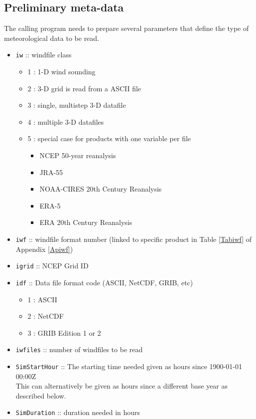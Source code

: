 \documentclass[11pt]{article}   %
\begin{document}
\subsection{Preliminary meta-data}\label{SSecPrelimMetaData}
The calling program needs to prepare several parameters that define the type of meteorological
data to be read.  
\begin{itemize}
\item \texttt{iw} :: windfile class 
 \begin{itemize}
 \item 1 : 1-D wind sounding
 \item 2 : 3-D grid is read from a ASCII file
 \item 3 : single, multistep 3-D datafile
 \item 4 : multiple 3-D datafiles
 \item 5 : special case for products with one variable per file
   \begin{itemize}
     \item NCEP 50-year reanalysis
     \item JRA-55
     \item NOAA-CIRES 20th Century Reanalysis
     \item ERA-5
     \item ERA 20th Century Reanalysis
   \end{itemize}
 \end{itemize}
\item \texttt{iwf} :: windfile format number (linked to specific product in Table
  \ref{Tabiwf} of Appendix \ref{Apiwf})
\item \texttt{igrid} :: NCEP Grid ID
\item \texttt{idf} :: Data file format code (ASCII, NetCDF, GRIB, etc)
 \begin{itemize}
 \item   1 : ASCII
 \item   2 : NetCDF
 \item   3 : GRIB Edition 1 or 2
 \end{itemize}
\item \texttt{iwfiles} :: number of windfiles to be read
\item \texttt{SimStartHour} ::  The starting time needed given as hours since 1900-01-01 00:00Z\\
This can alternatively be given as hours since a different base year as described below.
\item \texttt{SimDuration} ::  duration needed in hours
\end{itemize}
\end{document}
